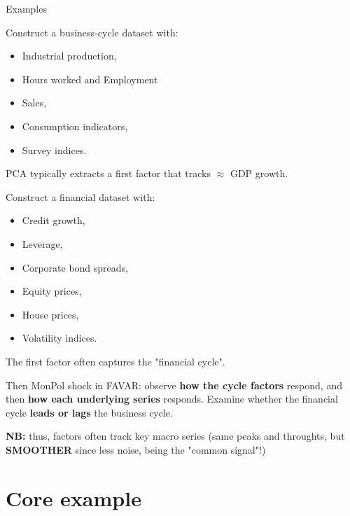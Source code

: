 \documentclass{beamer}
\begin{document}
\begin{frame}{Examples}
\scriptsize

Construct a business-cycle dataset with:
\begin{itemize}
    \item Industrial production,
    \item Hours worked and Employment
    \item Sales,
    \item Consumption indicators,
    \item Survey indices.
\end{itemize}
PCA typically extracts a first factor that tracks $\approx$ GDP growth.

\smallskip
Construct a financial dataset with:
\begin{itemize}
    \item Credit growth,
    \item Leverage,
    \item Corporate bond spreads,
    \item Equity prices,
    \item House prices,
    \item Volatility indices.
\end{itemize}
The first factor often captures the "financial cycle".

\medskip

Then MonPol shock in FAVAR: observe \textbf{how the cycle factors} respond, and then\textbf{ how each underlying series} responds. Examine whether the financial cycle \textbf{leads or lags} the business cycle.

\medskip
\textbf{NB:} thus, factors often track key macro series (same peaks and throughts, but \textbf{SMOOTHER} since less noise, being the "common signal"!)

\end{frame}











\section{Core example}
\end{document}
